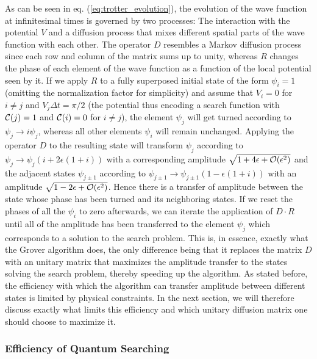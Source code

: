 As can be seen in eq. (\ref{eq:trotter_evolution}), the evolution of the wave function at infinitesimal times is governed by two processes: The interaction with the potential $V$ and a diffusion process that mixes different spatial parts of the wave function with each other. The operator $D$ resembles a Markov diffusion process since each row and column of the matrix sums up to unity, whereas $R$ changes the phase of each element of the wave function as a function of the local potential seen by it. If we apply $R$ to a fully superposed initial state of the form $\psi_i = 1$ (omitting the normalization factor for simplicity) and assume that $V_i = 0$ for $i \ne j$ and $V_j \Delta t = \pi/2$ (the potential thus encoding a search function with $\Or(j)=1$ and $\Or(i)=0$ for $i\ne j$), the element $\psi_j$ will get turned according to $\psi_j \to i\psi_j $, whereas all other elements $\psi_i$ will remain unchanged. Applying the operator $D$ to the resulting state will transform $\psi_j$ according to $\psi_j \to \psi_j(i+2\epsilon(1+i))$ with a corresponding amplitude $\sqrt{1+4\epsilon+\begin{mathcal}O\end{mathcal}(\epsilon^2)}$ and the adjacent states $\psi_{j\pm 1}$ according to $\psi_{j\pm 1} \to \psi_{j\pm 1}(1-\epsilon(1+i))$ with an amplitude $\sqrt{1-2\epsilon +\begin{mathcal}O\end{mathcal}(\epsilon^2)}$. Hence there is a transfer of amplitude between the state whose phase has been turned and its neighboring states. If we reset the phases of all the $\psi_i$ to zero afterwards, we can iterate the application of $D\cdot R$ until all of the amplitude has been transferred to the element $\psi_j$ which corresponds to a solution to the search problem. This is, in essence, exactly what the Grover algorithm does, the only difference being that it replaces the matrix $D$ with an unitary matrix that maximizes the amplitude transfer to the states solving the search problem, thereby speeding up the algorithm. As stated before, the efficiency with which the algorithm can transfer amplitude between different states is limited by physical constraints. In the next section, we will therefore discuss exactly what limits this efficiency and which unitary diffusion matrix one should choose to maximize it.

\subsubsection{Efficiency of Quantum Searching}

